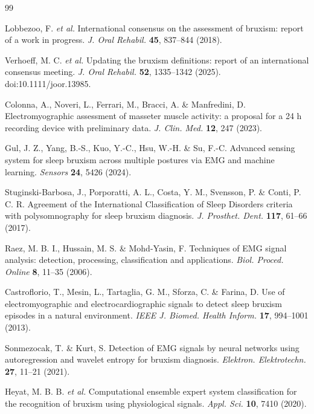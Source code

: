 \documentclass[pdflatex,sn-nature,iicol]{sn-jnl}
\begin{document}
\begin{thebibliography}{99}

Lobbezoo, F. \emph{et al.} International consensus on the assessment of bruxism: report of a work in progress. \emph{J. Oral Rehabil.} \textbf{45}, 837--844 (2018).

Verhoeff, M. C. \emph{et al.} Updating the bruxism definitions: report of an international consensus meeting. \emph{J. Oral Rehabil.} \textbf{52}, 1335--1342 (2025). doi:10.1111/joor.13985.

Colonna, A., Noveri, L., Ferrari, M., Bracci, A. \& Manfredini, D. Electromyographic assessment of masseter muscle activity: a proposal for a 24 h recording device with preliminary data. \emph{J. Clin. Med.} \textbf{12}, 247 (2023).

Gul, J. Z., Yang, B.-S., Kuo, Y.-C., Hsu, W.-H. \& Su, F.-C. Advanced sensing system for sleep bruxism across multiple postures via EMG and machine learning. \emph{Sensors} \textbf{24}, 5426 (2024).

Stuginski-Barbosa, J., Porporatti, A. L., Costa, Y. M., Svensson, P. \& Conti, P. C. R. Agreement of the International Classification of Sleep Disorders criteria with polysomnography for sleep bruxism diagnosis. \emph{J. Prosthet. Dent.} \textbf{117}, 61--66 (2017).

Raez, M. B. I., Hussain, M. S. \& Mohd-Yasin, F. Techniques of EMG signal analysis: detection, processing, classification and applications. \emph{Biol. Proced. Online} \textbf{8}, 11--35 (2006).

Castroflorio, T., Mesin, L., Tartaglia, G. M., Sforza, C. \& Farina, D. Use of electromyographic and electrocardiographic signals to detect sleep bruxism episodes in a natural environment. \emph{IEEE J. Biomed. Health Inform.} \textbf{17}, 994--1001 (2013).

Sonmezocak, T. \& Kurt, S. Detection of EMG signals by neural networks using autoregression and wavelet entropy for bruxism diagnosis. \emph{Elektron. Elektrotechn.} \textbf{27}, 11--21 (2021).

Heyat, M. B. B. \emph{et al.} Computational ensemble expert system classification for the recognition of bruxism using physiological signals. \emph{Appl. Sci.} \textbf{10}, 7410 (2020).


\end{thebibliography}
\end{document}
